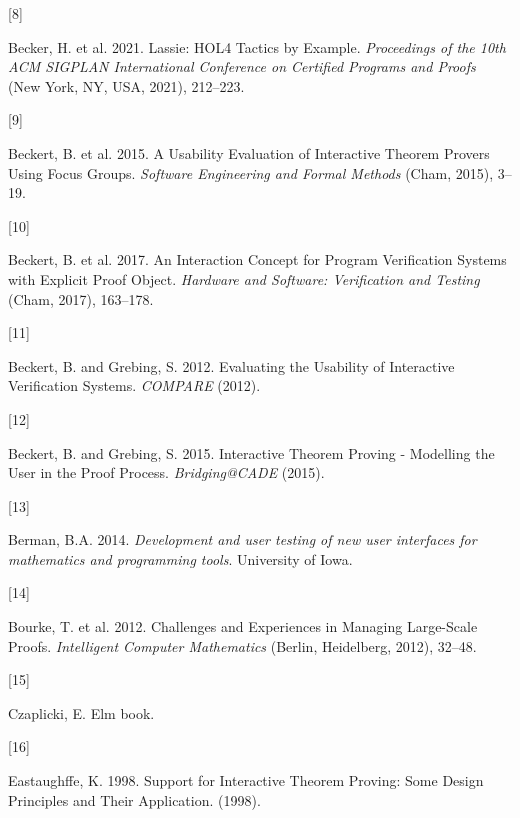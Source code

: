 \documentclass[
]{article}
\newlength{\cslhangindent}
\newlength{\csllabelwidth}
\newlength{\cslentryspacingunit} %
\newenvironment{CSLReferences}[2] %
 {%
  \setlength{\parindent}{0pt}
  \ifodd #1
  \let\oldpar\par
  \def\par{\hangindent=\cslhangindent\oldpar}
  \fi
  \setlength{\parskip}{#2\cslentryspacingunit}
 }%
 {}
\newcommand{\CSLLeftMargin}[1]{\parbox[t]{\csllabelwidth}{#1}}
\newcommand{\CSLRightInline}[1]{\parbox[t]{\linewidth - \csllabelwidth}{#1}\break}
\begin{document}
\begin{CSLReferences}{0}{0}
\leavevmode{}%
\CSLLeftMargin{{[}8{]} }
\CSLRightInline{Becker, H. et al. 2021. Lassie: {HOL4} {Tactics} by
{Example}. \emph{Proceedings of the 10th {ACM} {SIGPLAN} {International}
{Conference} on {Certified} {Programs} and {Proofs}} (New York, NY, USA,
2021), 212--223.}

\leavevmode{}%
\CSLLeftMargin{{[}9{]} }
\CSLRightInline{Beckert, B. et al. 2015. A {Usability} {Evaluation} of
{Interactive} {Theorem} {Provers} {Using} {Focus} {Groups}.
\emph{Software {Engineering} and {Formal} {Methods}} (Cham, 2015),
3--19.}

\leavevmode{}%
\CSLLeftMargin{{[}10{]} }
\CSLRightInline{Beckert, B. et al. 2017. An {Interaction} {Concept} for
{Program} {Verification} {Systems} with {Explicit} {Proof} {Object}.
\emph{Hardware and {Software}: {Verification} and {Testing}} (Cham,
2017), 163--178.}

\leavevmode{}%
\CSLLeftMargin{{[}11{]} }
\CSLRightInline{Beckert, B. and Grebing, S. 2012. Evaluating the
{Usability} of {Interactive} {Verification} {Systems}. \emph{{COMPARE}}
(2012).}

\leavevmode{}%
\CSLLeftMargin{{[}12{]} }
\CSLRightInline{Beckert, B. and Grebing, S. 2015. Interactive {Theorem}
{Proving} - {Modelling} the {User} in the {Proof} {Process}.
\emph{Bridging@{CADE}} (2015).}

\leavevmode{}%
\CSLLeftMargin{{[}13{]} }
\CSLRightInline{Berman, B.A. 2014. \emph{Development and user testing of
new user interfaces for mathematics and programming tools}. University
of Iowa.}

\leavevmode{}%
\CSLLeftMargin{{[}14{]} }
\CSLRightInline{Bourke, T. et al. 2012. Challenges and {Experiences} in
{Managing} {Large}-{Scale} {Proofs}. \emph{Intelligent {Computer}
{Mathematics}} (Berlin, Heidelberg, 2012), 32--48.}

\leavevmode{}%
\CSLLeftMargin{{[}15{]} }
\CSLRightInline{Czaplicki, E. Elm book.}

\leavevmode{}%
\CSLLeftMargin{{[}16{]} }
\CSLRightInline{Eastaughffe, K. 1998. Support for {Interactive}
{Theorem} {Proving}: {Some} {Design} {Principles} and {Their}
{Application}. (1998).}


\end{CSLReferences}
\end{document}

